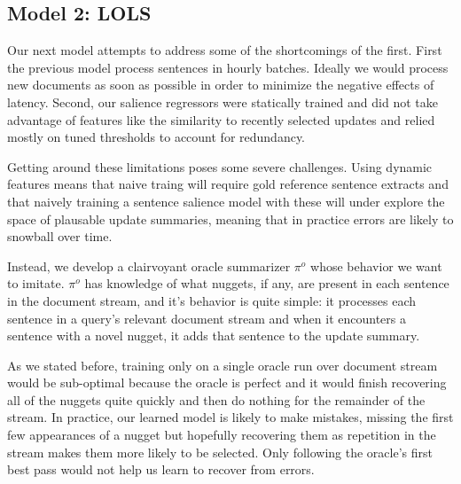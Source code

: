 \subsection{Model 2: LOLS}

Our next model attempts to address some of the shortcomings of the 
first. First the previous model process sentences in hourly batches.
Ideally we would process new documents as soon as possible in order 
to minimize the negative effects of latency. Second, our salience
regressors were statically trained and did not take advantage of features
like the similarity to recently selected updates and relied mostly on
tuned thresholds to account for redundancy. 

Getting around these limitations poses some severe challenges. Using
dynamic features means that naive traing will require gold reference
sentence extracts and that naively training a sentence salience model
with these will under explore the space of plausable update summaries,
meaning that in practice errors are likely to snowball over time.

Instead, we develop a clairvoyant oracle summarizer $\pi^o$ whose behavior
we want to imitate. $\pi^o$ has knowledge of what nuggets, if any, 
are present in each sentence in the document stream, and it's behavior
is quite simple: it processes each sentence in a query's relevant document 
stream and 
when it encounters a sentence with a novel nugget, it adds that sentence
to the update summary.

As we stated before, training only on a single oracle run over document stream
would be sub-optimal because the oracle is perfect and it would finish 
recovering all of the nuggets quite quickly and then do nothing for
the remainder of the stream. In practice, our learned model is likely to
make mistakes, missing the first few appearances of a nugget but hopefully
recovering them as repetition in the stream makes them more likely to be 
selected. Only following the oracle's first best pass would not help us learn
to recover from errors.

